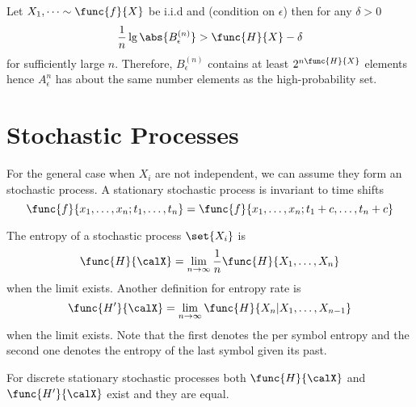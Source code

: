 \begin{theorem}
    Let \(X_1 , \dots \sim \func{f}{X}\) be i.i.d and (condition on \(\epsilon\)) then for any \(\delta > 0\) 
    \begin{equation*}
        \dfrac{1}{n} \lg \abs{B_{\epsilon}^{(n)}} > \func{H}{X} - \delta
    \end{equation*}
    for sufficiently large \(n\). Therefore, \(B_{\epsilon}^{(n)}\) contains at least \(2^{n \func{H}{X}}\) elements hence \(A_{\epsilon}^{n}\) has about the same number elements as the high-probability set.
\end{theorem}

\section{Stochastic Processes}
For the general case when \(X_i\) are not independent, we can assume they form an stochastic process. A stationary stochastic process is invariant to time shifts 
\begin{equation*}
    \func{f}{x_1, \dots, x_n ; t_1 , \dots , t_n} = \func{f}{x_1, \dots, x_n ; t_1 + c , \dots , t_n + c}
\end{equation*}
\begin{definition} 
    The entropy of a stochastic process \(\set{X_i}\) is 
    \begin{equation*}
        \func{H}{\calX} = \lim_{n \to \infty} \dfrac{1}{n} \func{H}{X_1, \dots , X_n}
    \end{equation*}
    when the limit exists. Another definition for entropy rate is 
    \begin{equation*}
        \func{H'}{\calX} =  \lim_{n \to \infty}  \func{H}{X_n |X_1, \dots , X_{n-1}}
    \end{equation*}
    when the limit exists. Note that the first denotes the per symbol entropy and the second one denotes the entropy of the last symbol given its past. 
\end{definition}
\begin{theorem}
    For discrete stationary stochastic processes both \(\func{H}{\calX}\) and \(\func{H'}{\calX}\) exist and they are equal. 
\end{theorem}

